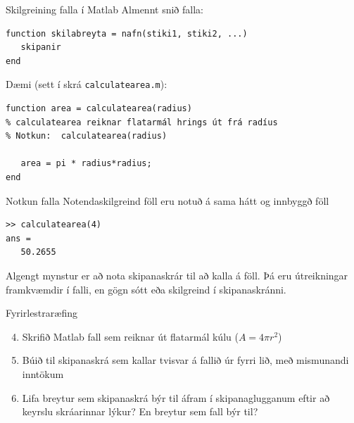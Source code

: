 \documentclass[handout]{beamer}
\begin{document}
\begin{frame}[fragile]{Skilgreining falla í Matlab}
Almennt snið falla:
\begin{verbatim}
function skilabreyta = nafn(stiki1, stiki2, ...)
   skipanir
end
\end{verbatim}
Dæmi (sett í skrá \texttt{calculatearea.m}):
\begin{verbatim}
function area = calculatearea(radius)
% calculatearea reiknar flatarmál hrings út frá radíus
% Notkun:  calculatearea(radius)

   area = pi * radius*radius;
end
\end{verbatim}

\end{frame}

\begin{frame}[fragile]{Notkun falla}
Notendaskilgreind föll eru notuð á sama hátt og innbyggð föll
\begin{verbatim}
>> calculatearea(4)
ans =
   50.2655
\end{verbatim}
Algengt mynstur er að nota skipanaskrár til að kalla á föll. Þá eru útreikningar framkvæmdir í falli, en gögn sótt eða skilgreind í skipanaskránni.
\end{frame}

\begin{frame}{Fyrirlestraræfing}
    
\begin{enumerate}
    \setcounter{enumi}{3}
    \item Skrifið Matlab fall sem reiknar út flatarmál kúlu ($A = 4\pi r^2$)
    \item Búið til skipanaskrá sem kallar tvisvar á fallið úr fyrri lið, með mismunandi inntökum
    \item Lifa breytur sem skipanaskrá býr til áfram í skipanaglugganum eftir að keyrslu skráarinnar lýkur? En breytur sem fall býr til?
\end{enumerate}
    
\end{frame}
\end{document}
